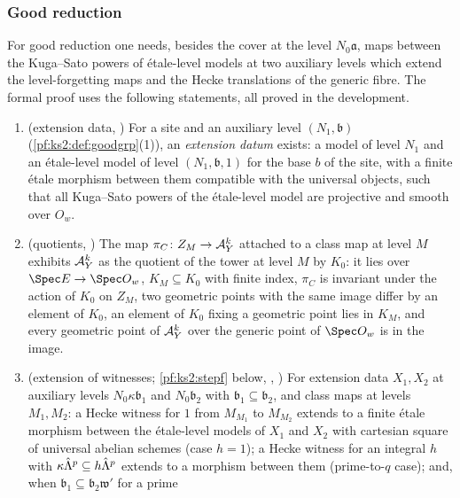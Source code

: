 \subsubsection{Good reduction}

For good reduction one needs, besides the cover at the level $N_0\mathfrak a$, maps between the
Kuga--Sato powers of \'etale-level models at two auxiliary levels which extend the level-forgetting
maps and the Hecke translations of the generic fibre. The formal proof uses the following
statements, all proved in the development.
\begin{enumerate}[label=(G\arabic*)]
\item\label{pf:ks2:G:ext} (extension data, ) For a
  site and an auxiliary level $(N_1,\mathfrak b)$ (\cref{pf:ks2:def:goodgrp}(1)),
  an \emph{extension datum} exists: a model of level $N_1$ and an
  \'etale-level model of level $(N_1,\mathfrak b,1)$ for the base $b$ of the site, with a finite
  \'etale morphism between them compatible with the universal objects, such that all Kuga--Sato
  powers of the \'etale-level model are projective and smooth over $O_w$.
\item\label{pf:ks2:G:quot} (quotients, ) The map
  $\pi_C\colon Z_M\to\mathcal{A}_Y^k$ attached to a class map at level $M$ exhibits $\mathcal{A}_Y^k$ as the
  quotient of the tower at level $M$ by $K_0$: it
  lies over $\Spec E\to\Spec O_w$, $K_M\subseteq K_0$ with finite index, $\pi_C$ is invariant under
  the action of $K_0$ on $Z_M$, two geometric points with the same image differ by an element of
  $K_0$, an element of $K_0$ fixing a geometric point lies in $K_M$, and every geometric point of
  $\mathcal{A}_Y^k$ over the generic point of $\Spec O_w$ is in the image.
\item\label{pf:ks2:G:steps} (extension of witnesses; \cref{pf:ks2:stepf} below,
  ,
  ) For extension data $X_1,X_2$ at auxiliary
  levels $N_0\kappa\mathfrak b_1$ and $N_0\mathfrak b_2$ with $\mathfrak b_1\subseteq\mathfrak b_2$, and
  class maps at levels $M_1,M_2$: a Hecke witness for $1$ from $M_{M_1}$ to $M_{M_2}$ extends to a
  finite \'etale morphism between the \'etale-level models of $X_1$ and $X_2$ with cartesian square of
  universal abelian schemes (case $h=1$); a Hecke witness for an integral $h$ with
  $\kappa\hat\Lambda^{p}\subseteq h\hat\Lambda^{p}$ extends to a morphism between them
  (prime-to-$q$ case); and, when $\mathfrak b_1\subseteq\mathfrak b_2\mathfrak w'$ for a prime

\end{enumerate}
